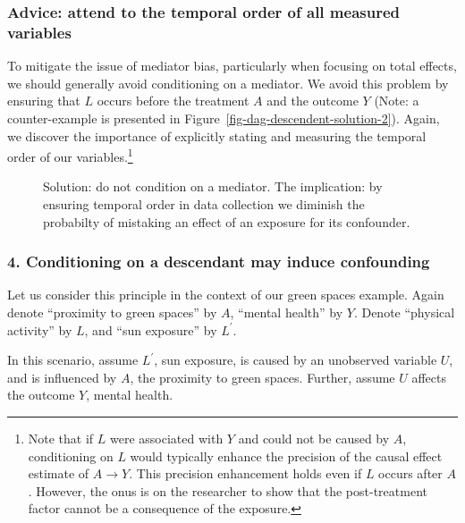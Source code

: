 \documentclass[
  singlecolumn]{article}
\begin{document}
\subsubsection{Advice: attend to the temporal order of all measured
variables}\label{advice-attend-to-the-temporal-order-of-all-measured-variables-2}

To mitigate the issue of mediator bias, particularly when focusing on
total effects, we should generally avoid conditioning on a mediator. We
avoid this problem by ensuring that \(L\) occurs before the treatment
\(A\) and the outcome \(Y\) (Note: a counter-example is presented in
Figure~\ref{fig-dag-descendent-solution-2}). Again, we discover the
importance of explicitly stating and measuring the temporal order of our
variables.\footnote{Note that if \(L\) were associated with \(Y\) and
  could not be caused by \(A\), conditioning on \(L\) would typically
  enhance the precision of the causal effect estimate of \(A \to Y\).
  This precision enhancement holds even if \(L\) occurs after \(A\).
  However, the onus is on the researcher to show that the post-treatment
  factor cannot be a consequence of the exposure.}

\begin{figure}[htb]


\caption{\label{fig-dag-mediator-solution}Solution: do not condition on
a mediator. The implication: by ensuring temporal order in data
collection we diminish the probabilty of mistaking an effect of an
exposure for its confounder.}

\end{figure}%

\subsubsection{4. Conditioning on a descendant may induce
confounding}\label{conditioning-on-a-descendant-may-induce-confounding}

Let us consider this principle in the context of our green spaces
example. Again denote ``proximity to green spaces'' by \(A\), ``mental
health'' by \(Y\). Denote ``physical activity'' by \(L\), and ``sun
exposure'' by \(L^\prime\).

In this scenario, assume \(L^\prime\), sun exposure, is caused by an
unobserved variable \(U\), and is influenced by \(A\), the proximity to
green spaces. Further, assume \(U\) affects the outcome \(Y\), mental
health.
\end{document}
